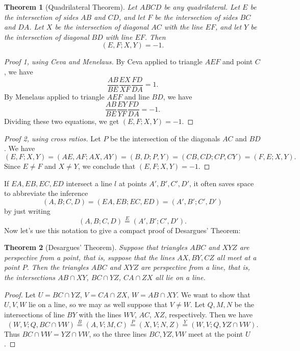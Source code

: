 \documentclass[letterpaper,11pt]{article}
\newtheorem{thm}{Theorem}
\theoremstyle{definition}
\theoremstyle{remark}
\begin{document}
\begin{thm}[Quadrilateral Theorem] Let $ABCD$ be any quadrilateral. Let $E$ be the intersection of sides $AB$ and $CD$, and let $F$ be the intersection of sides $BC$ and $DA$. Let $X$ be the intersection of diagonal $AC$ with the line $EF$, and let $Y$ be the intersection of diagonal $BD$ with line $EF$. Then
\[
(E,F;X,Y) = -1.
\]
\end{thm}
\begin{proof}[Proof 1, using Ceva and Menelaus] By Ceva applied to triangle $AEF$ and point $C$, we have
\[
\frac{AB}{BE}\frac{EX}{XF}\frac{FD}{DA} = 1.
\]
By Menelaus applied to triangle $AEF$ and line $BD$, we have
\[
\frac{AB}{BE}\frac{EY}{YF}\frac{FD}{DA} = -1.
\]
Dividing these two equations, we get $(E,F;X,Y) = -1$.
\end{proof}
\begin{proof}[Proof 2, using cross ratios] Let $P$ be the intersection of the diagonals $AC$ and $BD$. We have
\[
(E,F;X,Y) = (AE,AF;AX,AY) = (B,D;P,Y) = (CB,CD;CP,CY) = (F,E;X,Y).
\]
Since $E\ne F$ and $X\ne Y$, we conclude that $(E,F;X,Y) = -1$.
\end{proof}

If $EA,EB,EC,ED$ intersect a line $l$ at points $A',B',C',D'$, it often saves space to abbreviate the inference
\[
(A,B;C,D) = (EA,EB;EC,ED) = (A',B';C',D')
\]
by just writing
\[
(A,B;C,D) \stackrel{E}{=} (A',B';C',D').
\]
Now let's use this notation to give a compact proof of Desargues' Theorem:

\begin{thm}[Desargues' Theorem]\label{desargues} Suppose that triangles $ABC$ and $XYZ$ are \emph{perspective from a point}, that is, suppose that the lines $AX,BY,CZ$ all meet at a point $P$. Then the triangles $ABC$ and $XYZ$ are \emph{perspective from a line}, that is, the intersections $AB\cap XY$, $BC\cap YZ$, $CA\cap ZX$ all lie on a line.
\end{thm}
\begin{proof}
Let $U = BC\cap YZ$, $V = CA\cap ZX$, $W = AB\cap XY$. We want to show that $U,V,W$ lie on a line, so we may as well suppose that $V\ne W$. Let $Q,M,N$ be the intersections of line $BY$ with the lines $WV$, $AC$, $XZ$, respectively. Then we have
\[
(W,V;Q,BC\cap VW) \stackrel{B}{=} (A,V;M,C) \stackrel{P}{=} (X,V;N,Z) \stackrel{Y}{=} (W,V;Q,YZ\cap VW).
\]
Thus $BC\cap VW = YZ\cap VW$, so the three lines $BC,YZ,VW$ meet at the point $U$.
\end{proof}
\end{document}
